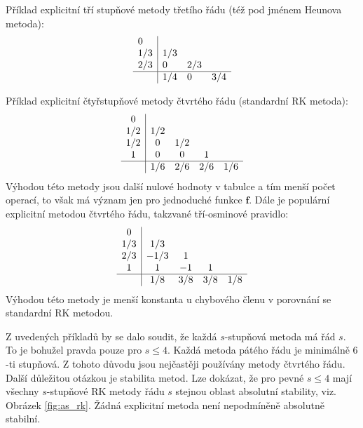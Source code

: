 \documentclass[a4paper, 12pt]{book}
\theoremstyle{definition}
\def\vc#1{\mathbf{\boldsymbol{#1}}}     %
\begin{document}
Příklad explicitní tří stupňové metody třetího řádu (též pod jménem Heunova metoda):
\begin{equation}
    \begin{array}{l|lll}
        0 &  &  &  \\
        1/3 & 1/3 &  &  \\
        2/3 & 0 & 2/3 &  \\
        \hline
             & 1/4 & 0 & 3/4 \\
    \end{array}
\end{equation}

Příklad explicitní čtyřstupňové metody čtvrtého řádu (standardní RK metoda):
\begin{equation}
    \begin{array}{c|cccc}
        0 &  &  &  & \\
        1/2 & 1/2 &  &  & \\
        1/2 & 0 & 1/2 &  & \\
        1 & 0 & 0 & 1 & \\
        \hline
             & 1/6 & 2/6 & 2/6 & 1/6 \\
    \end{array}    
\end{equation}
Výhodou této metody jsou další nulové hodnoty v tabulce a tím menší počet operací, to však má význam jen pro jednoduché funkce $\vc f$.
Dále je populární explicitní metodou čtvrtého řádu, takzvané tří-osminové pravidlo:
\begin{equation}
    \begin{array}{c|cccc}
        0 &  &  &  & \\
        1/3 & 1/3 &  &  & \\
        2/3 & -1/3 & 1 &  & \\
        1 & 1 & -1 & 1 & \\
        \hline
             & 1/8 & 3/8 & 3/8 & 1/8 \\
    \end{array}    
\end{equation}
Výhodou této metody je menší konstanta u chybového členu v porovnání se standardní RK metodou.

Z uvedených příkladů by se dalo soudit, že každá $s$-stupňová metoda má řád $s$. To je bohužel pravda pouze pro $s\le 4$.
Každá metoda pátého řádu je minimálně $6$-ti stupňová. Z tohoto důvodu jsou nejčastěji používány metody čtvrtého řádu.
Další důležitou otázkou je stabilita metod. Lze dokázat, že pro pevné $s\le  4$ mají všechny $s$-stupňové RK metody řádu $s$
stejnou oblast absolutní stability, viz. Obrázek \ref{fig:as_rk}. Žádná explicitní metoda není nepodmíněně absolutně stabilní.
\end{document}
